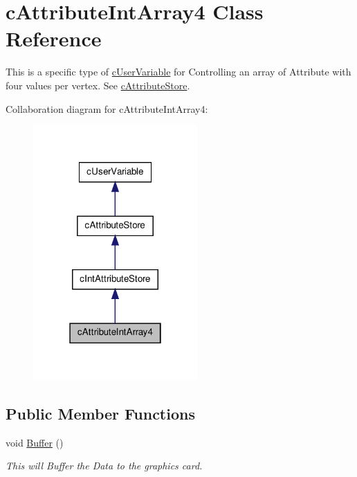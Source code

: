 \hypertarget{classc_attribute_int_array4}{
\section{cAttributeIntArray4 Class Reference}
\label{classc_attribute_int_array4}
}


This is a specific type of \hyperlink{classc_user_variable}{cUserVariable} for Controlling an array of Attribute with four values per vertex. See \hyperlink{classc_attribute_store}{cAttributeStore}.  




Collaboration diagram for cAttributeIntArray4:\nopagebreak
\begin{figure}[H]
\begin{center}
\leavevmode
\includegraphics[width=178pt]{classc_attribute_int_array4__coll__graph}
\end{center}
\end{figure}
\subsection*{Public Member Functions}
\begin{DoxyCompactItemize}
\item 
\hypertarget{classc_attribute_int_array4_a5c819b31a4b3966b50b35fe388a1f712}{
void \hyperlink{classc_attribute_int_array4_a5c819b31a4b3966b50b35fe388a1f712}{Buffer} ()}
\label{classc_attribute_int_array4_a5c819b31a4b3966b50b35fe388a1f712}

\begin{DoxyCompactList}\small\item\em This will Buffer the Data to the graphics card. \end{DoxyCompactList}\end{DoxyCompactItemize}


